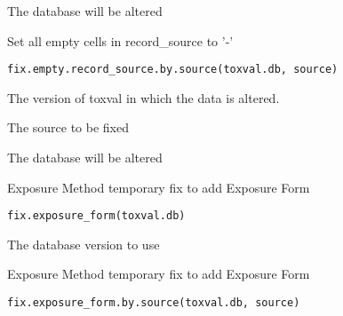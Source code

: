 \documentclass[letterpaper]{book}
\begin{document}
%
\begin{Value}
The database will be altered
\end{Value}
%
\begin{Description}\relax
Set all empty cells in record\_source to '-'
\end{Description}
%
\begin{Usage}
\begin{verbatim}
fix.empty.record_source.by.source(toxval.db, source)
\end{verbatim}
\end{Usage}
%
\begin{Arguments}
\begin{ldescription}
\item[\code{toxval.db}] The version of toxval in which the data is altered.

\item[\code{source}] The source to be fixed
\end{ldescription}
\end{Arguments}
%
\begin{Value}
The database will be altered
\end{Value}
%
\begin{Description}\relax
Exposure Method temporary fix to add Exposure Form
\end{Description}
%
\begin{Usage}
\begin{verbatim}
fix.exposure_form(toxval.db)
\end{verbatim}
\end{Usage}
%
\begin{Arguments}
\begin{ldescription}
\item[\code{toxval.db}] The database version to use
\end{ldescription}
\end{Arguments}
%
\begin{Description}\relax
Exposure Method temporary fix to add Exposure Form
\end{Description}
%
\begin{Usage}
\begin{verbatim}
fix.exposure_form.by.source(toxval.db, source)
\end{verbatim}
\end{Usage}
\end{document}
